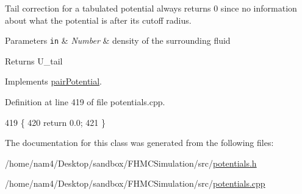 Tail correction for a tabulated potential always returns 0 since no information about what the potential is after its cutoff radius. 


\begin{DoxyParams}[1]{Parameters}
\mbox{\tt in}  & {\em Number} & density of the surrounding fluid\\
\hline
\end{DoxyParams}
\begin{DoxyReturn}{Returns}
U\-\_\-tail 
\end{DoxyReturn}


Implements \hyperlink{classpair_potential_a5387d21d8d487d1d42e9eaf7cae9175b}{pair\-Potential}.



Definition at line 419 of file potentials.\-cpp.


\begin{DoxyCode}
419                                                      \{
420     \textcolor{keywordflow}{return} 0.0;
421 \}
\end{DoxyCode}


The documentation for this class was generated from the following files\-:\begin{DoxyCompactItemize}
\item 
/home/nam4/\-Desktop/sandbox/\-F\-H\-M\-C\-Simulation/src/\hyperlink{potentials_8h}{potentials.\-h}\item 
/home/nam4/\-Desktop/sandbox/\-F\-H\-M\-C\-Simulation/src/\hyperlink{potentials_8cpp}{potentials.\-cpp}\end{DoxyCompactItemize}
